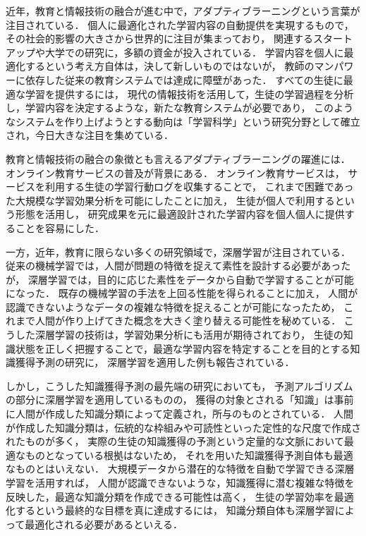 近年，教育と情報技術の融合が進む中で，アダプティブラーニングという言葉が注目されている．
個人に最適化された学習内容の自動提供を実現するもので，その社会的影響の大きさから世界的に注目が集まっており，
関連するスタートアップや大学での研究に，多額の資金が投入されている．
学習内容を個人に最適化するという考え方自体は，決して新しいものではないが，
教師のマンパワーに依存した従来の教育システムでは達成に障壁があった．
すべての生徒に最適な学習を提供するには，
現代の情報技術を活用して，生徒の学習過程を分析し，学習内容を決定するような，新たな教育システムが必要であり，
このようなシステムを作り上げようとする動向は「学習科学」という研究分野として確立され，今日大きな注目を集めている．


教育と情報技術の融合の象徴とも言えるアダプティブラーニングの躍進には．
オンライン教育サービスの普及が背景にある．
オンライン教育サービスは，
サービスを利用する生徒の学習行動ログを収集することで，
これまで困難であった大規模な学習効果分析を可能にしたことに加え，
生徒が個人で利用するという形態を活用し，
研究成果を元に最適設計された学習内容を個人個人に提供することを容易にした．


一方，近年，教育に限らない多くの研究領域で，深層学習が注目されている．
従来の機械学習では，人間が問題の特徴を捉えて素性を設計する必要があったが，
深層学習では，目的に応じた素性をデータから自動で学習することが可能になった．
既存の機械学習の手法を上回る性能を得られることに加え，
人間が認識できないようなデータの複雑な特徴を捉えることが可能になったため，
これまで人間が作り上げてきた概念を大きく塗り替える可能性を秘めている．
こうした深層学習の技術は，学習効果分析にも活用が期待されており，
生徒の知識状態を正しく把握することで，最適な学習内容を特定することを目的とする知識獲得予測の研究に，
深層学習を適用した例も報告されている．

しかし，こうした知識獲得予測の最先端の研究においても，
予測アルゴリズムの部分に深層学習を適用しているものの，
獲得の対象とされる「知識」は事前に人間が作成した知識分類によって定義され，所与のものとされている．
人間が作成した知識分類は，伝統的な枠組みや可読性といった定性的な尺度で作成されたものが多く，
実際の生徒の知識獲得の予測という定量的な文脈において最適なものとなっている根拠はないため，
それを用いた知識獲得予測自体も最適なものとはいえない．
大規模データから潜在的な特徴を自動で学習できる深層学習を活用すれば，
人間が認識できないような，知識獲得に潜む複雑な特徴を反映した，最適な知識分類を作成できる可能性は高く，
生徒の学習効率を最適化するという最終的な目標を真に達成するには，
知識分類自体も深層学習によって最適化される必要があるといえる．


